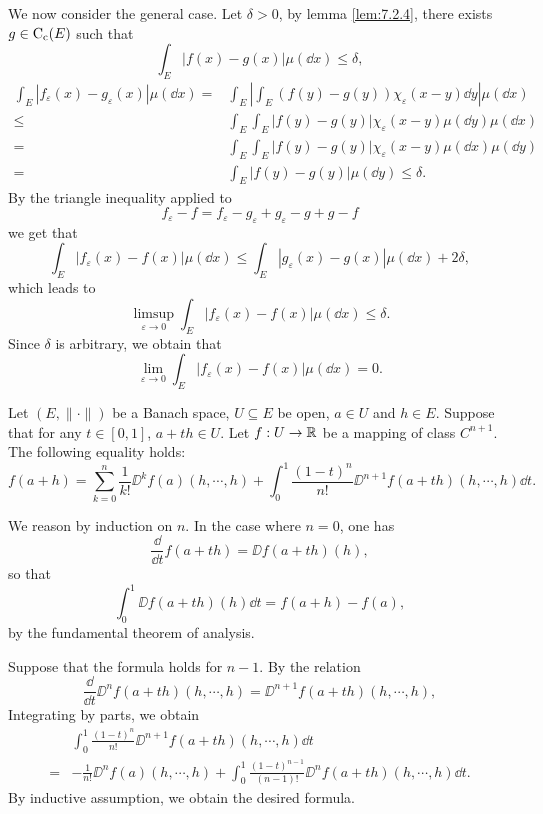 \begin{proofenv}
\begin{enumerate}
            \quad We now consider the general case.
            Let $\delta > 0$, by lemma \ref{lem:7.2.4}, there exists $g \in \operatorname{C_{c}}(E)$ such that 
            $$\int_{E} |f(x) - g(x)|\mu(\dd x) \le \delta,$$
            $$\begin{aligned}
                \int_{E} |f_{\varepsilon}(x) - g_{\varepsilon}(x)| \mu(\dd x) = & \int_{E} \left|\int_{E} (f(y) - g(y))\chi_{\varepsilon}(x - y)\dd y\right| \mu(\dd x)\\
                \le & \int_{E} \int_{E} |f(y) - g(y)|\chi_{\varepsilon}(x-y)\mu(\dd y) \mu(\dd x)\\
                = & \int_{E} \int_{E} |f(y) - g(y)|\chi_{\varepsilon}(x-y)\mu(\dd x) \mu(\dd y)\\
                = & \int_{E} |f(y) - g(y)| \mu(\dd y) \le \delta.
            \end{aligned}$$
            By the triangle inequality applied to
            $$f_{\varepsilon} - f = f_{\varepsilon} - g_{\varepsilon} + g_{\varepsilon} - g + g - f$$
            we get that
            $$\int_{E} |f_{\varepsilon}(x) - f(x)| \mu(\dd x) \le \int_{E} |g_{\varepsilon}(x) - g(x)| \mu(\dd x) + 2 \delta,$$
            which leads to
            $$\limsup_{\varepsilon \to 0} \int_{E} |f_{\varepsilon}(x) - f(x)| \mu(\dd x) \le \delta.$$
            Since $\delta$ is arbitrary, we obtain that
            $$\lim_{\varepsilon \to 0} \int_{E} |f_{\varepsilon}(x) - f(x)| \mu(\dd x) = 0.$$
    \end{enumerate}
\end{proofenv}

\begin{theoremenv}\label{thm:7.2.6}
    Let $(E,\|\cdot\|)$ be a Banach space, $U \subseteq E$ be open,
    $a \in U$ and $h \in E$.
    Suppose that for any $t \in [0,1]$, $a + th \in U$.
    Let $f : U \rightarrow \mathbb{R}$ be a mapping of class $C^{n+1}$.
    The following equality holds:
    $$f(a + h) = \sum_{k=0}^{n} \frac{1}{k!} \DD^k f(a)(h,\cdots,h) + \int_{0}^{1}\frac{(1 - t)^n}{n!} \DD^{n+1}f(a + th)(h,\cdots,h)\dd t.$$
\end{theoremenv}
\begin{proofenv}
    We reason by induction on $n$.
    In the case where $n = 0$, one has
    $$\frac{\dd}{\dd t} f(a + th) = \DD f(a + th)(h),$$
    so that
    $$\int_{0}^{1} \DD f(a + th)(h) \dd t = f(a + h) - f(a),$$
    by the fundamental theorem of analysis.

    \quad Suppose that the formula holds for $n-1$.
    By the relation
    $$\frac{\dd}{\dd t}\DD^n f(a + th)(h,\cdots,h) = \DD^{n+1}f(a + th)(h,\cdots,h),$$
    Integrating by parts, we obtain
    $$\begin{aligned}
        & \int_{0}^{1} \frac{(1 - t)^n}{n!} \DD^{n+1}f(a + th)(h,\cdots,h) \dd t\\
        = & -\frac{1}{n!}\DD^n f(a)(h,\cdots,h) + \int_{0}^{1} \frac{(1 - t)^{n-1}}{(n-1)!} \DD^n f(a + th)(h,\cdots,h) \dd t.
    \end{aligned}$$
    By inductive assumption, we obtain the desired formula.
\end{proofenv}

